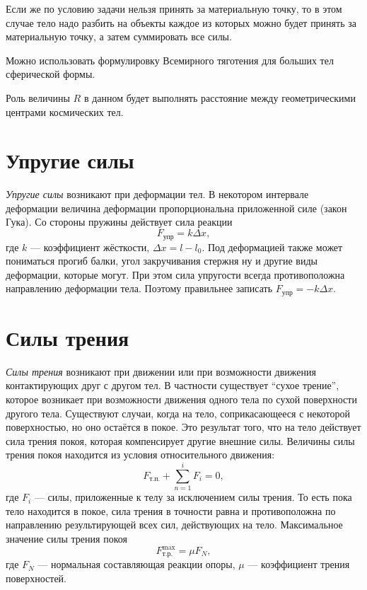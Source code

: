 \documentclass[10pt]{extbook}
\begin{document}
Если же по условию задачи нельзя принять за материальную точку, то в этом
случае тело надо разбить на объекты каждое из которых можно будет принять за
материальную точку, а затем суммировать все силы.

Можно использовать формулировку Всемирного тяготения для больших тел сферической формы.

Роль величины \( R \) в данном будет выполнять расстояние между геометрическими
центрами космических тел.

\section{Упругие силы}%

\emph{Упругие силы} возникают при деформации тел. В некотором интервале
деформации величина деформации пропорциональна приложенной силе (закон Гука).
Со стороны пружины действует сила реакции \[
	F_\text{упр} = k \Delta x
	,\] где \( k \) --- коэффициент жёсткости, \( \Delta x = l - l_0 \). Под
деформацией также может пониматься прогиб балки, угол закручивания стержня ну
и другие виды деформации, которые могут. При этом сила упругости всегда
противоположна направлению деформации тела. Поэтому правильнее записать \(
F_\text{упр} = - k \Delta x \).

\section{Силы трения}%

\emph{Силы трения} возникают при движении или при возможности движения
контактирующих друг с другом тел. В частности существует ``сухое трение'',
которое возникает при возможности движения одного тела по сухой поверхности
другого тела. Существуют случаи, когда на тело, соприкасающееся с некоторой
поверхностью, но оно остаётся в покое. Это результат того, что на тело
действует сила трения покоя, которая компенсирует другие внешние силы. Величины
силы трения покоя находится из условия относительного движения: \[
	F_\text{т.п.} + \sum_{n=1}^{i} F_i = 0
	,\] где \( F_i \) --- силы, приложенные к телу за исключением силы трения. То
есть пока тело находится в покое, сила трения в точности равна и
противоположна по направлению результирующей всех сил, действующих на тело.
Максимальное значение силы трения покоя \[
	F_\text{т.р.}^\text{max} = \mu F_N
	,\] где \( F_N \) --- нормальная составляющая реакции опоры, \( \mu \) ---
коэффициент трения поверхностей.
\end{document}
